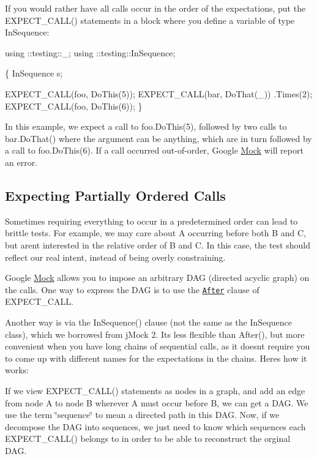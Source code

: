 If you would rather have all calls occur in the order of the expectations, put the {\ttfamily E\+X\+P\+E\+C\+T\+\_\+\+C\+A\+L\+L()} statements in a block where you define a variable of type {\ttfamily In\+Sequence}\+:


\begin{DoxyCode}
using ::testing::\_;
using ::testing::InSequence;

\{
  InSequence s;

  EXPECT\_CALL(foo, DoThis(5));
  EXPECT\_CALL(bar, DoThat(\_))
      .Times(2);
  EXPECT\_CALL(foo, DoThis(6));
\}
\end{DoxyCode}


In this example, we expect a call to {\ttfamily foo.\+Do\+This(5)}, followed by two calls to {\ttfamily bar.\+Do\+That()} where the argument can be anything, which are in turn followed by a call to {\ttfamily foo.\+Do\+This(6)}. If a call occurred out-\/of-\/order, Google \hyperlink{class_mock}{Mock} will report an error.

\subsection*{Expecting Partially Ordered Calls}

Sometimes requiring everything to occur in a predetermined order can lead to brittle tests. For example, we may care about {\ttfamily A} occurring before both {\ttfamily B} and {\ttfamily C}, but aren\textquotesingle{}t interested in the relative order of {\ttfamily B} and {\ttfamily C}. In this case, the test should reflect our real intent, instead of being overly constraining.

Google \hyperlink{class_mock}{Mock} allows you to impose an arbitrary D\+AG (directed acyclic graph) on the calls. One way to express the D\+AG is to use the \href{http://code.google.com/p/googlemock/wiki/V1_6_CheatSheet#The_After_Clause}{\tt After} clause of {\ttfamily E\+X\+P\+E\+C\+T\+\_\+\+C\+A\+LL}.

Another way is via the {\ttfamily In\+Sequence()} clause (not the same as the {\ttfamily In\+Sequence} class), which we borrowed from j\+Mock 2. It\textquotesingle{}s less flexible than {\ttfamily After()}, but more convenient when you have long chains of sequential calls, as it doesn\textquotesingle{}t require you to come up with different names for the expectations in the chains. Here\textquotesingle{}s how it works\+:

If we view {\ttfamily E\+X\+P\+E\+C\+T\+\_\+\+C\+A\+L\+L()} statements as nodes in a graph, and add an edge from node A to node B wherever A must occur before B, we can get a D\+AG. We use the term \char`\"{}sequence\char`\"{} to mean a directed path in this D\+AG. Now, if we decompose the D\+AG into sequences, we just need to know which sequences each {\ttfamily E\+X\+P\+E\+C\+T\+\_\+\+C\+A\+L\+L()} belongs to in order to be able to reconstruct the orginal D\+AG.

